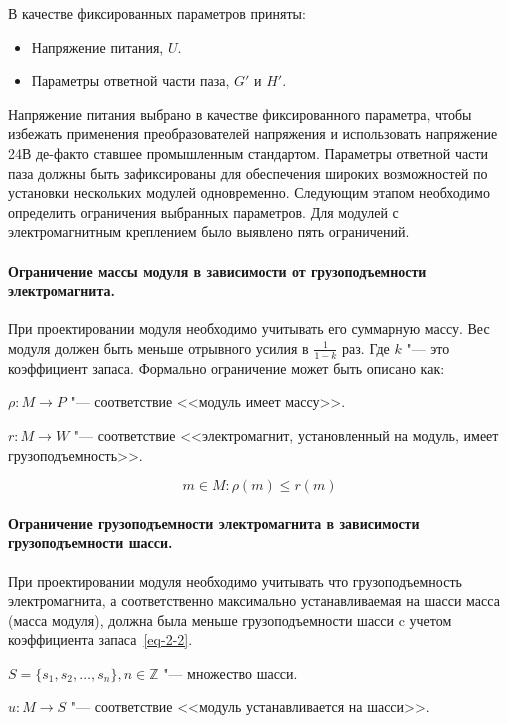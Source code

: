 В качестве фиксированных параметров приняты:

\begin{itemize}
	\item Напряжение питания, $U$.
	\item Параметры ответной части паза, $G'$ и $H'$.
\end{itemize}

Напряжение питания выбрано в качестве фиксированного параметра, чтобы избежать применения преобразователей напряжения и использовать напряжение 24\:В де-факто ставшее промышленным стандартом. Параметры ответной части паза должны быть зафиксированы для обеспечения  широких возможностей по установки нескольких модулей одновременно. Следующим этапом необходимо определить ограничения выбранных параметров. Для модулей с электромагнитным креплением было выявлено пять ограничений.

\paragraph{Ограничение массы модуля в зависимости от грузоподъемности электромагнита.} При проектировании модуля необходимо учитывать его суммарную массу. Вес модуля должен быть меньше отрывного усилия в $\frac{1}{1-k}$ раз. Где $k$ "--- это коэффициент запаса. Формально ограничение может быть описано как:

\noindent $\rho : M \rightarrow P$ "--- соответствие <<модуль имеет массу>>.

\noindent $r : M \rightarrow W$ "--- соответствие <<электромагнит, установленный на модуль, имеет грузоподъемность>>.

\begin{equation}
m \in M: \rho(m) \leq r(m)
\end{equation}

\paragraph{Ограничение грузоподъемности электромагнита в зависимости грузоподъемности шасси.} При проектировании модуля необходимо учитывать что грузоподъемность электромагнита, а соответственно максимально устанавливаемая на шасси масса (масса модуля), должна была меньше грузоподъемности шасси c учетом коэффициента запаса~\cref{eq-2-2}.

\noindent $S = \{s_1, s_2, \ldots, s_n\}, n \in \mathbb{Z}$ "--- множество шасси.

\noindent $u: M \rightarrow S$ "--- соответствие <<модуль устанавливается  на шасси>>. 

